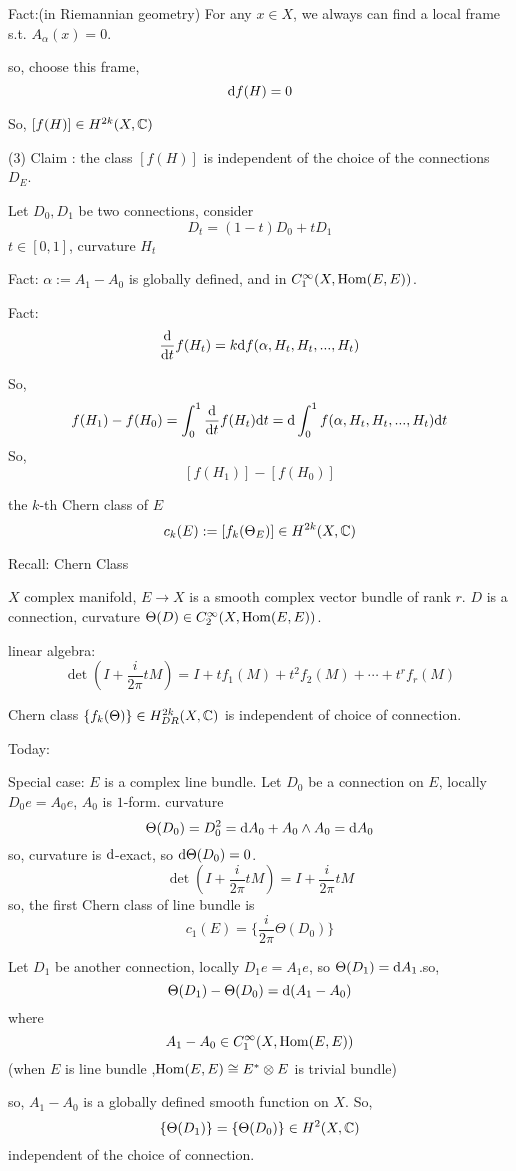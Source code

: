 Fact:(in Riemannian geometry) For any $x\in X$,
we always can find a local frame s.t.
$A_\alpha(x)=0$.

so, choose this frame,
$$\mathrm{d} f(H)=0$$

So, $[f(H)]\in H^{2k}(X,\mathbb{C})$

(3) Claim : the class $[f(H)]$ is independent of the choice of the connections $D_E$.

Let $D_0,D_1$ be two connections, consider
$$D_t=(1-t)D_0+tD_1$$
$t\in[0,1]$, curvature $H_t$

Fact: $\alpha:=A_1-A_0$ is globally defined, and in $C_1^\infty(X,\operatorname{Hom}(E,E))$.

Fact: $$\frac{\mathrm{d}}{\mathrm{d} t}f(H_t)=k\mathrm{d} f(\alpha,H_t,H_t,...,H_t)$$

So,
$$f(H_1)-f(H_0)=
\int_0^1\frac{\mathrm{d}}{\mathrm{d} t}f(H_t)\mathrm{d} t
=\mathrm{d}\int_0^1f(\alpha,H_t,H_t,...,H_t)\mathrm{d} t$$
So,
$$[f(H_1)]-[f(H_0)]$$

\begin{definition}
the $k$-th Chern class of $E$
$$c_k(E):=[f_k(\Theta_E)]\in H^{2k}(X,\mathbb{C})$$
\end{definition}

Recall: Chern Class

$X$ complex manifold, $E\to X$ is a smooth complex vector bundle of rank $r$.
$D$ is a connection, curvature $\Theta(D)\in C_2^\infty(X,\operatorname{Hom}(E,E))$.

linear algebra:
$$\det(I+\frac{i}{2\pi}tM)=I+tf_1(M)+t^2f_2(M)+\cdots+t^rf_r(M)$$

Chern class $\{f_k(\Theta)\}\in H^{2k}_{DR}(X,\mathbb{C})$ is independent of choice of connection.

Today:

Special case: $E$ is a complex line bundle.
Let $D_0$ be a connection on $E$, locally $D_0e=A_0e$, $A_0$ is $1$-form.
curvature
$$\Theta(D_0)=D_0^2=\mathrm{d} A_0+A_0\wedge A_0=\mathrm{d} A_0$$
so, curvature is $\mathrm{d}$-exact, so $\mathrm{d}\Theta(D_0)=0$.
$$\det(I+\frac{i}{2\pi}tM)=I+\frac{i}{2\pi}tM$$
so, the first Chern class of line bundle is
$$c_1(E)=\{\frac{i}{2\pi}\Theta(D_0)\}$$

Let $D_1$ be another connection, locally $D_1e=A_1e$, so
$\Theta(D_1)=\mathrm{d} A_1$.so,
$$\Theta(D_1)-\Theta(D_0)=\mathrm{d}(A_1-A_0)$$
where
$$A_1-A_0\in C_1^\infty(X,\operatorname{Hom}(E,E))$$
(when $E$ is line bundle ,$\operatorname{Hom}(E,E)\cong E^*\otimes E$ is trivial bundle)

so, $A_1-A_0$ is a globally defined smooth function on $X$. So,
$$\{\Theta(D_1)\}=\{\Theta(D_0)\}\in H^2(X,\mathbb{C})$$
independent of the choice of connection.


